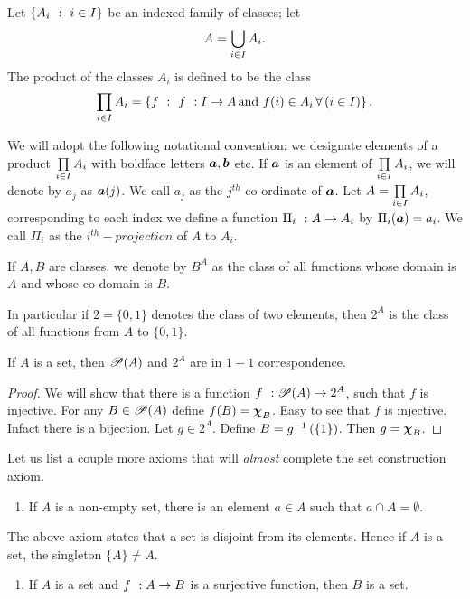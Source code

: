\begin{Definition}
    Let $\set{A_i}{i\in I}$ be an indexed family of classes; let
    \[A = \indexUnion{A_i}{i}{I}.\]
    The product of the classes $A_i$ is defined to be the class
    \[\indexProduct{A_i}{i}{I} = \set{f}{\map{f}{I}{A}\,\text{and $f(i)\in A_i$}\,\forEv{i\in I}}.\]
\end{Definition}
We will adopt the following notational convention: we designate elements of a product
$\indexProduct{A_i}{i}{I}$ with boldface letters $\vect{a},\vect{b}$ etc. If $\vect{a}$ is an
element of $\indexProduct{A_i}{i}{I}$, we will denote by $a_j$ as $\vect{a}(j)$. We call $a_j$ as
the $j^{th}$ co-ordinate of $\vect{a}$.
Let $A = \indexProduct{A_i}{i}{I}$, corresponding to each index we define a function
$\map{\Pi_{i}}{A}{A_i}$ by
$\Pi_i(\vect{a}) = a_i$. We call $\Pi_i$ as the $i^{th}-projection$ of $A$ to $A_i$.

\begin{Definition}
    If $A,B$ are classes, we denote by $B^A$ as the class of all functions whose domain is $A$ and
    whose co-domain is $B$.
\end{Definition}
In particular if $2 = \lbrace 0,1\rbrace $ 
denotes the class of two elements, then $2^A$ is the class of all functions 
from $A$ to $\lbrace 0,1\rbrace$.
\begin{Theorem}
    If $A$ is a set, then  $\powSet{A}$ and $2^A$ are in $1-1$ correspondence.
\end{Theorem}
\begin{proof}
We will show that there is a function $\map{f}{\powSet{A}}{2^A}$, such that $f$ is injective.
For any $B \in \powSet{A}$ define $f(B) = \charFunc{B}$. Easy to see that $f$ is injective. Infact
there is a bijection. Let $g \in 2^A$. Define $B = \invIm{g}{\lbrace 1 \rbrace }$. 
Then $g = \charFunc{B}$.
\end{proof}

Let us list a couple more axioms that will \emph{almost} complete the set construction axiom. 

\begin{enumerate}[label=\bfseries Axiom 9:]
    \item If $A$ is a non-empty set, there is an element $a \in A$ such that $a\cap {A} =
	\emptyset$.
\end{enumerate}
The above axiom states that a set is disjoint from its elements. Hence if $A$ is a set, the
singleton $\lbrace A \rbrace \neq A$.
\begin{enumerate}[label=\bfseries Axiom 10:]
    \item If $A$ is a set and $\map{f}{A}{B}$ is a surjective function, then $B$ is a set.
\end{enumerate}

